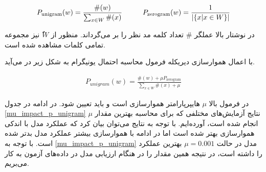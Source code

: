\documentclass[12pt, a4paper]{book}
\begin{document}
\begin{latin}
    \begin{eqnarray*}
        P_{\text{unigram}}(w) = \frac{\#(w)}{\sum_{x \in W} \#(x)} \hspace*{1cm} P_{\text{zerogram}}(w) = \frac{1}{|\{ x | x \in W \}|}
    \end{eqnarray*}
\end{latin}

در نوشتار بالا عملگر $\#$ تعداد کلمه مد نظر را بر می‌گرداند. منظور از $ٌW$ نیز مجموعه تمامی کلمات مشاهده شده است.

با اعمال هموارسازی دیریکله فرمول محاسبه احتمال یونیگرام به شکل زیر در می‌آید.

\begin{latin}
    \begin{eqnarray*}
        P_{unigram}(w) = \frac{\#(w) + \mu P_{\text{zerogram}}}{\sum_{x \in W} \#(x) + \mu}
    \end{eqnarray*}
\end{latin}

در فرمول بالا $\mu$ هایپرپارامتر هموارسازی است و باید تعیین شود.
در ادامه در جدول \autoref{mu_impact_p_unigram} نتایج آزمایش‌های مختلفی که برای محاسبه بهترین مقدار $\mu$
انجام شده است، آورده‌ایم. با توجه به نتایج می‌توان بیان کرد که عملکرد مدل با اندکی هموار‌سازی بهتر شده است
اما در ادامه با هموار‌سازی بیشتر عملکرد مدل بد‌تر شده است. با توجه به \autoref{mu_impact_p_unigram}
مدل در حالت $\mu=0.001$ بهترین عملکرد را داشته است، در نتیجه همین مقدار را در هنگام ارزیابی مدل در
داده‌های آزمون به کار می‌بریم.
\end{document}
